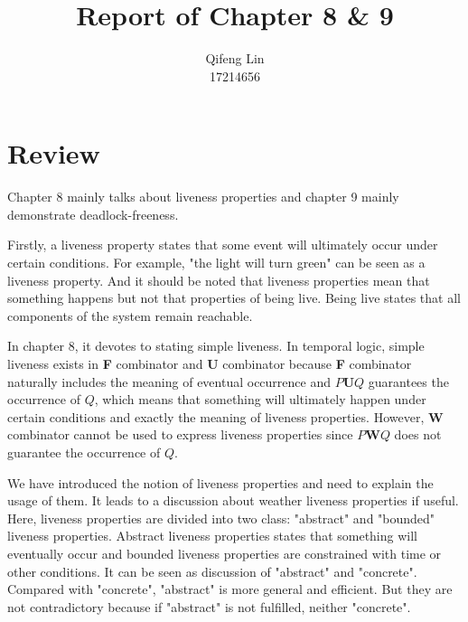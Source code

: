 \documentclass{acmtog} %
\begin{document}

\title{Report of Chapter 8 \& 9} %

\author{Qifeng Lin \\ 17214656}


\maketitle


\section{Review}
    Chapter 8 mainly talks about liveness properties and chapter 9 mainly demonstrate deadlock-freeness.

    Firstly, a liveness property states that some event will ultimately occur under certain conditions. For example, "the light will turn green" can be seen as a liveness property. And it should be noted that liveness properties mean that something happens but not that properties of being live. Being live states that all components of the system remain reachable.

    In chapter 8, it devotes to stating simple liveness. In temporal logic, simple liveness exists in \textbf{F} combinator and \textbf{U} combinator because \textbf{F} combinator naturally includes the meaning of eventual occurrence and $P\textbf{U}Q$ guarantees the occurrence of $Q$, which means that something will ultimately happen under certain conditions and exactly the meaning of liveness properties. However, \textbf{W} combinator cannot be used to express liveness properties since $P\textbf{W}Q$ does not guarantee the occurrence of $Q$.

    We have introduced the notion of liveness properties and need to explain the usage of them. It leads to a discussion about weather liveness properties if useful. Here, liveness properties are divided into two class: "abstract" and "bounded" liveness properties. Abstract liveness properties states that something will eventually occur and bounded liveness properties are constrained with time or other conditions. It can be seen as discussion of "abstract" and "concrete". Compared with "concrete", "abstract" is more general and efficient. But they are not contradictory because if "abstract" is not fulfilled, neither "concrete".
\end{document}
